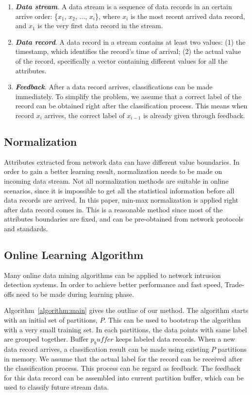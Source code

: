 \documentclass[runningheads]{llncs}
\begin{document}
	\begin{enumerate}
		\item \textbf{\textit{Data stream}}. A data stream is a sequence of data records in an certain arrive order: \big\{$x_1$, $x_2$, ..., $x_i$\big\}, where $x_i$ is the most recent arrived data record, and $x_1$ is the very first data record in the stream.
		\item \textbf{\textit{Data record}}. A data record in a stream contains at least two values: (1) the timestamp, which identifies the record's time of arrival; (2) the actual value of the record, specifically a vector containing different values for all the attributes.
		\item \textbf{\textit{Feedback}}. After a data record arrives, classifications can be made immediately. To simplify the problem, we assume that a correct label of the record can be obtained right after the classification process. This means when record $x_i$ arrives, the correct label of $x_{i-1}$ is already given through feedback.
	\end{enumerate}
	
	\subsection{Normalization}
	Attributes extracted from network data can have different value boundaries. In order to gain a better learning result, normalization needs to be made on incoming data stream. Not all normalization methods are suitable in online scenarios, since it is impossible to get all the statistical information before all data records are arrived. In this paper, min-max normalization is applied right after data record comes in. This is a reasonable method since most of the attributes boundaries are fixed, and can be pre-obtained from network protocols and standards.
	
	\subsection{Online Learning Algorithm}
	Many online data mining algorithms can be applied to network intrusion detection systems. In order to achieve better performance and fast speed, Trade-offs need to be made during learning phase.
	
	Algorithm~\ref{algorithm:main} gives the outline of our method. The algorithm starts with an initial set of partitions, $P$. This can be used to bootstrap the algorithm with a very small training set. In each partitions, the data points with same label are grouped together. Buffer $p_buffer$ keeps labeled data records. When a new data record arrives, a classification result can be made using existing $P$ partitions in memory. We assume that the actual label for the record can be received after the classification process. This process can be regard as feedback. The feedback for this data record can be assembled into current partition buffer, which can be used to classify future stream data.
	
\end{document}
